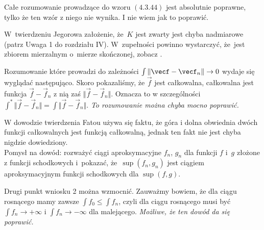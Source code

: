 \documentclass[a4paper,11pt]{article}
\numberwithin{equation}{section}
\begin{document}
\VerSpaceFour





\noindent
{} Całe rozumowanie prowadzące do wzoru $(4.3.44)$ jest
absolutnie poprawne, tylko że ten wzór z niego nie wynika. I nie wiem
jak to poprawić.

\VerSpaceFour





\noindent
{} W~twierdzeniu Jegorowa założenie, że~$K$ jest zwarty
jest chyba nadmiarowe (patrz Uwaga 1 do rozdziału IV). W~zupełności
powinno wystarczyć, że~jest zbiorem mierzalnym o~mierze skończonej,
zobacz \cite{RudinAnalizaRzeczywistaIZespolona1998}.

\VerSpaceFour





\noindent
{} Rozumowanie które prowadzi do zależności
$\int \Vert \vecf - \vecf_{ n } \Vert \to 0$ wydaje się
wyglądać następująco. Skoro pokazaliśmy, że $\vec{ f }$ jest
całkowalna, całkowalna jest funkcja $\vec{ f } - \vec{ f }_{ n }$ z
nią zaś $\Vert \vec{ f } - \vec{ f }_{ n } \Vert$. Oznacza to w
szczególności
$\int^{ * } \Vert \vec{ f } - \vec{ f }_{ n } \Vert = \int \Vert \vec{
  f } - \vec{ f }_{ n } \Vert$. \textit{To rozumowanie można chyba mocno
  poprawić.}

\VerSpaceFour





\noindent
{} W dowodzie twierdzenia Fatou używa się faktu, że góra
i dolna obwiednia dwóch funkcji całkowalnych jest funkcją
całkowalną, jednak ten fakt nie jest chyba nigdzie dowiedziony. \\
Pomysł na dowód: rozważyć ciągi aproksymacyjne $f_{ n }$, $g_{ n }$
dla funkcji $f$ i~$g$ złożone z funkcji schodkowych i~pokazać,
że~$\sup( f_{ n }, g_{ n } )$ jest ciągiem aproksymacyjnym funkcji
schodkowych dla $\sup( f, g )$.

\VerSpaceFour





\noindent
{} Drugi punkt wniosku 2
można wzmocnić. Zauważmy bowiem, że dla ciągu rosnącego mamy zawsze
$\int f_{ 0 } \leq \int f_{ n }$, czyli dla ciągu rosnącego musi być
$\int f_{ n } \to +\infty$ i $\int f_{ n } \to -\infty$ dla
malejącego. \textit{Możliwe, że ten dowód da się poprawić.}

\VerSpaceFour
\end{document}
